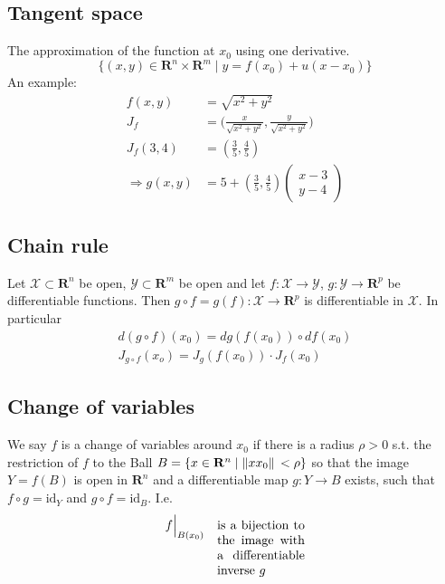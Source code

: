 \documentclass[8pt]{extarticle}
\newcommand{\R}{{\mathbb R}}
\newcommand{\X}{{\mathcal X}}
\newcommand{\ra}{{\rightarrow}}
\def\R{\mathbf{R}}
\begin{document}
\begin{multicols*}{3}
  \subsection{Tangent space}
  The approximation of the function at $x_0$ using one derivative.
  $$\{(x, y) \in \R^n \times \R^m \;|\; y = f(x_0) + u(x - x_0)\}$$
  An example:
  \begin{align*}
    f(x, y)             & = \sqrt{x^2 + y^2}                                                   \\
    J_f                 & = \Big( \frac{x}{\sqrt{x^2 + y^2}}, \frac{y}{\sqrt{x^2 + y^2}} \Big) \\
    J_f(3, 4)           & = (\frac{3}{5}, \frac{4}{5})                                         \\
    \Rightarrow g(x, y) & = 5 + (\frac{3}{5}, \frac{4}{5}) \begin{pmatrix}
      x-3 \\
      y-4
    \end{pmatrix}
  \end{align*}
  \subsection{Chain rule}
  Let $\X \subset \R^n$ be open,
  $\mathcal{Y} \subset \R^m$ be open and
  let $f: \X \ra \mathcal{Y}$, $g: \mathcal{Y} \ra \R^p$
  be differentiable functions. Then $g \circ f = g(f): \X \ra \R^p$
  is differentiable in $\X$. In particular
  \begin{align*}
    d(g \circ f)(x_0) = dg(f(x_0)) \circ df(x_0) \\
    J_{g \circ f}(x_o) = J_g(f(x_0)) \cdot J_f(x_0)
  \end{align*}
  \subsection{Change of variables}
  We say $f$ is a change of variables around
  $x_0$ if there is a radius $\rho > 0$ s.t. the restriction
  of $f$ to the Ball $B = \{x \in \R^n\;|\; \norm*{x  x_0} < \rho\}$
  so that the image $Y = f(B)$ is open in $\R^n$ and a differentiable
  map $g: Y \ra B$ exists, such that
  $f \circ g = \text{id}_Y$ and $g \circ f = \text{id}_B$.
  I.e.
  \begin{align*}
    f \Big |_{B(x_0)}
    \quad \parbox[t]{0.2\textwidth}{
      is a bijection to the image with
    a differentiable inverse $g$} 
  \end{align*}


\end{multicols*}
\end{document}
